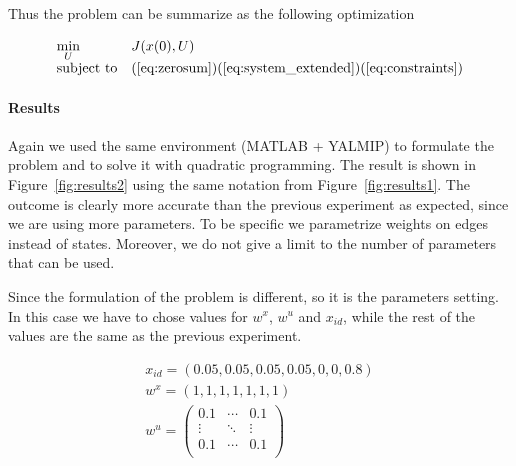 \documentclass[a4paper, 11pt]{article}
\theoremstyle{definition}
\theoremstyle{remark}
\begin{document}
Thus the problem can be summarize as the following optimization

\begin{equation} \label{eq:opt2}
	\begin{array}{ll}
		\underset{U}{\mbox{min}} & J(x(0),U) \\
		\mbox{subject to} &
		(\ref{eq:zerosum})(\ref{eq:system_extended})
		(\ref{eq:constraints}) \\
	\end{array}
\end{equation}


\paragraph{Results} %
\label{par:results2}
Again we used the same environment (MATLAB + YALMIP) to formulate the problem and to solve it with quadratic programming. The result is shown in Figure~\ref{fig:results2} using the same notation from Figure~\ref{fig:results1}. The outcome is clearly more accurate than the previous experiment as expected, since we are using more parameters. To be specific we parametrize weights on edges instead of states. Moreover, we do not give a limit to the number of parameters that can be used.

Since the formulation of the problem is different, so it is the parameters setting. In this case we have to chose values for $w^x$, $w^u$ and $x_{id}$, while the rest of the values are the same as the previous experiment.

\begin{equation}
	\begin{array}{l}
		x_{id} = (0.05, 0.05, 0.05, 0.05, 0, 0, 0.8) \\
		w^x = (1, 1, 1, 1, 1, 1, 1) \\
		w^u = 
		\begin{pmatrix}
			0.1 & \cdots & 0.1 \\
			\vdots & \ddots & \vdots \\
			0.1 & \cdots & 0.1 \\
		\end{pmatrix} \\
	\end{array}
\end{equation}
\end{document}
